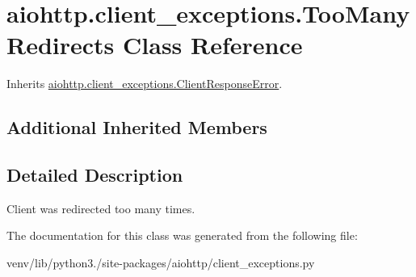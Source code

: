 \hypertarget{classaiohttp_1_1client__exceptions_1_1_too_many_redirects}{}\section{aiohttp.\+client\+\_\+exceptions.\+Too\+Many\+Redirects Class Reference}
\label{classaiohttp_1_1client__exceptions_1_1_too_many_redirects}


Inherits \hyperlink{classaiohttp_1_1client__exceptions_1_1_client_response_error}{aiohttp.\+client\+\_\+exceptions.\+Client\+Response\+Error}.

\subsection*{Additional Inherited Members}


\subsection{Detailed Description}
\begin{DoxyVerb}Client was redirected too many times.\end{DoxyVerb}
 

The documentation for this class was generated from the following file\+:\begin{DoxyCompactItemize}
\item 
venv/lib/python3./site-\/packages/aiohttp/client\+\_\+exceptions.\+py\end{DoxyCompactItemize}
